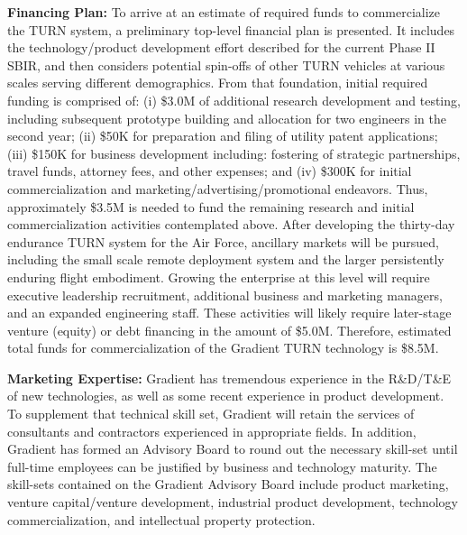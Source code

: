 \documentclass[11pt]{article}
\begin{document}
{\color{red} \bf Financing Plan:}
To arrive at an estimate of required funds to commercialize the TURN system, a preliminary top-level financial plan is presented.  It includes the technology/product development effort described for the current Phase II SBIR, and then considers potential spin-offs of other TURN vehicles at various scales serving different demographics.  From that foundation, initial required funding is comprised of: (i) \$3.0M of additional research development and testing, including subsequent prototype building and allocation for two engineers in the second year; (ii) \$50K for preparation and filing of utility patent applications; (iii) \$150K for business development including: fostering of strategic partnerships, travel funds, attorney fees, and other expenses; and (iv) \$300K for initial commercialization and marketing/advertising/promotional endeavors.  Thus, approximately \$3.5M is needed to fund the remaining research and initial commercialization activities contemplated above.  After developing the thirty-day endurance TURN system for the Air Force, ancillary markets will be pursued, including the small scale remote deployment system and the larger persistently enduring flight embodiment.  Growing the enterprise at this level will require executive leadership recruitment, additional business and marketing managers, and an expanded engineering staff.  These activities will likely require later-stage venture (equity) or debt financing in the amount of \$5.0M.  Therefore, estimated total funds for commercialization of the Gradient TURN technology is \$8.5M.


{\color{red} \bf Marketing Expertise:}
Gradient has tremendous experience in the R\&D/T\&E of new technologies, as well as some recent experience in product development.  To supplement that technical skill set, Gradient will retain the services of consultants and contractors experienced in appropriate fields.  In addition, Gradient has formed an Advisory Board to round out the necessary skill-set until full-time employees can be justified by business and technology maturity.  The skill-sets contained on the Gradient Advisory Board include product marketing, venture capital/venture development, industrial product development, technology commercialization, and intellectual property protection.








\end{document}

